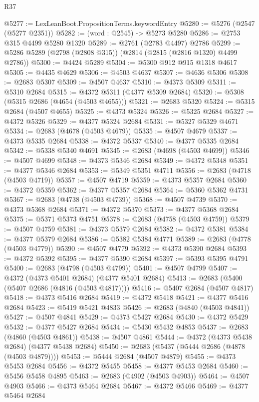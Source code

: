 \begin{lexlean}{R37}
\begin{coremodule}
@5277 := LexLeanBoot.PropositionTerms.keywordEntry
@5280 := @5276 (@2547 (@5277 @2351))
@5282 := (word : @2545) -> @5273 @5280
@5286 := @2753 @315 @4499 @5280 @1320
@5289 := @2761 (@2783 @4497) @2786
@5299 := @5286 @5289 (@2798 (@2808 @315)) (@2814 (@2815 (@2816 @1320) @4499 @2786))
@5300 := @4424 @5289
@5304 := @5300 @912 @915 @1318 @4617
@5305 := @4435 @4629
@5306 := @4503 @4637
@5307 := @4636 @5306
@5308 := @2683 @5307
@5309 := @4507 @4637
@5310 := @4373 @5309
@5311 := @5310 @2684
@5315 := @4372 @5311 (@4377 @5309 @2684)
@5320 := @5308 (@5315 @2686 (@4654 (@4503 @4655)))
@5321 := @2683 @5320
@5324 := @5315 @2684 (@4507 @4655)
@5325 := @4373 @5324
@5326 := @5325 @2684
@5327 := @4372 @5326
@5329 := @4377 @5324 @2684
@5331 := @5327 @5329 @4671
@5334 := @2683 (@4678 (@4503 @4679))
@5335 := @4507 @4679
@5337 := @4373 @5335 @2684
@5338 := @4372 @5337
@5340 := @4377 @5335 @2684
@5342 := @5338 @5340 @4691
@5345 := @2683 (@4698 (@4503 @4699))
@5346 := @4507 @4699
@5348 := @4373 @5346 @2684
@5349 := @4372 @5348
@5351 := @4377 @5346 @2684
@5353 := @5349 @5351 @4711
@5356 := @2683 (@4718 (@4503 @4719))
@5357 := @4507 @4719
@5359 := @4373 @5357 @2684
@5360 := @4372 @5359
@5362 := @4377 @5357 @2684
@5364 := @5360 @5362 @4731
@5367 := @2683 (@4738 (@4503 @4739))
@5368 := @4507 @4739
@5370 := @4373 @5368 @2684
@5371 := @4372 @5370
@5373 := @4377 @5368 @2684
@5375 := @5371 @5373 @4751
@5378 := @2683 (@4758 (@4503 @4759))
@5379 := @4507 @4759
@5381 := @4373 @5379 @2684
@5382 := @4372 @5381
@5384 := @4377 @5379 @2684
@5386 := @5382 @5384 @4771
@5389 := @2683 (@4778 (@4503 @4779))
@5390 := @4507 @4779
@5392 := @4373 @5390 @2684
@5393 := @4372 @5392
@5395 := @4377 @5390 @2684
@5397 := @5393 @5395 @4791
@5400 := @2683 (@4798 (@4503 @4799))
@5401 := @4507 @4799
@5407 := @4372 (@4373 @5401 @2684) (@4377 @5401 @2684)
@5413 := @2683 (@5400 (@5407 @2686 (@4816 (@4503 @4817))))
@5416 := @5407 @2684 (@4507 @4817)
@5418 := @4373 @5416 @2684
@5419 := @4372 @5418
@5421 := @4377 @5416 @2684
@5423 := @5419 @5421 @4833
@5426 := @2683 (@4840 (@4503 @4841))
@5427 := @4507 @4841
@5429 := @4373 @5427 @2684
@5430 := @4372 @5429
@5432 := @4377 @5427 @2684
@5434 := @5430 @5432 @4853
@5437 := @2683 (@4860 (@4503 @4861))
@5438 := @4507 @4861
@5444 := @4372 (@4373 @5438 @2684) (@4377 @5438 @2684)
@5450 := @2683 (@5437 (@5444 @2686 (@4878 (@4503 @4879))))
@5453 := @5444 @2684 (@4507 @4879)
@5455 := @4373 @5453 @2684
@5456 := @4372 @5455
@5458 := @4377 @5453 @2684
@5460 := @5456 @5458 @4895
@5463 := @2683 (@4902 (@4503 @4903))
@5464 := @4507 @4903
@5466 := @4373 @5464 @2684
@5467 := @4372 @5466
@5469 := @4377 @5464 @2684

\end{coremodule}
\end{lexlean}

